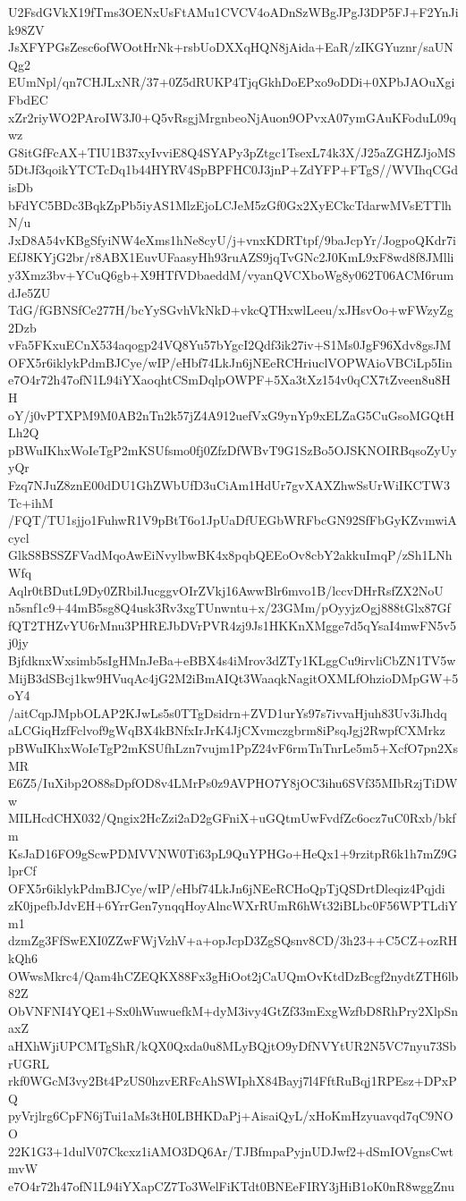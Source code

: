 U2FsdGVkX19fTms3OENxUsFtAMu1CVCV4oADnSzWBgJPgJ3DP5FJ+F2YnJik98ZV
JsXFYPGsZesc6ofWOotHrNk+rsbUoDXXqHQN8jAida+EaR/zIKGYuznr/saUNQg2
EUmNpl/qn7CHJLxNR/37+0Z5dRUKP4TjqGkhDoEPxo9oDDi+0XPbJAOuXgiFbdEC
xZr2riyWO2PAroIW3J0+Q5vRsgjMrgnbeoNjAuon9OPvxA07ymGAuKFoduL09qwz
G8itGfFcAX+TIU1B37xyIvviE8Q4SYAPy3pZtgc1TsexL74k3X/J25aZGHZJjoMS
5DtJf3qoikYTCTcDq1b44HYRV4SpBPFHC0J3jnP+ZdYFP+FTgS//WVIhqCGdisDb
bFdYC5BDc3BqkZpPb5iyAS1MlzEjoLCJeM5zGf0Gx2XyECkcTdarwMVsETTlhN/u
JxD8A54vKBgSfyiNW4eXms1hNe8cyU/j+vnxKDRTtpf/9baJcpYr/JogpoQKdr7i
EfJ8KYjG2br/r8ABX1EuvUFaasyHh93ruAZS9jqTvGNc2J0KmL9xF8wd8f8JMlli
y3Xmz3bv+YCuQ6gb+X9HTfVDbaeddM/vyanQVCXboWg8y062T06ACM6rumdJe5ZU
TdG/fGBNSfCe277H/bcYySGvhVkNkD+vkcQTHxwlLeeu/xJHsvOo+wFWzyZg2Dzb
vFa5FKxuECnX534aqogp24VQ8Yu57bYgcI2Qdf3ik27iv+S1Ms0JgF96Xdv8gsJM
OFX5r6iklykPdmBJCye/wIP/eHbf74LkJn6jNEeRCHriuclVOPWAioVBCiLp5Iin
e7O4r72h47ofN1L94iYXaoqhtCSmDqlpOWPF+5Xa3tXz154v0qCX7tZveen8u8HH
oY/j0vPTXPM9M0AB2nTn2k57jZ4A912uefVxG9ynYp9xELZaG5CuGsoMGQtHLh2Q
pBWuIKhxWoIeTgP2mKSUfsmo0fj0ZfzDfWBvT9G1SzBo5OJSKNOIRBqsoZyUyyQr
Fzq7NJuZ8znE00dDU1GhZWbUfD3uCiAm1HdUr7gvXAXZhwSsUrWiIKCTW3Tc+ihM
/FQT/TU1sjjo1FuhwR1V9pBtT6o1JpUaDfUEGbWRFbcGN92SfFbGyKZvmwiAcycl
GlkS8BSSZFVadMqoAwEiNvylbwBK4x8pqbQEEoOv8cbY2akkuImqP/zSh1LNhWfq
Aqlr0tBDutL9Dy0ZRbilJucggvOIrZVkj16AwwBlr6mvo1B/lccvDHrRsfZX2NoU
n5snf1c9+44mB5sg8Q4usk3Rv3xgTUnwntu+x/23GMm/pOyyjzOgj888tGlx87Gf
fQT2THZvYU6rMnu3PHREJbDVrPVR4zj9Js1HKKnXMgge7d5qYsaI4mwFN5v5j0jy
BjfdknxWxsimb5sIgHMnJeBa+eBBX4s4iMrov3dZTy1KLggCu9irvliCbZN1TV5w
MijB3dSBcj1kw9HVuqAc4jG2M2iBmAIQt3WaaqkNagitOXMLfOhzioDMpGW+5oY4
/aitCqpJMpbOLAP2KJwLs5s0TTgDsidrn+ZVD1urYs97s7ivvaHjuh83Uv3iJhdq
aLCGiqHzfFclvof9gWqBX4kBNfxIrJrK4JjCXvmczgbrm8iPsqJgj2RwpfCXMrkz
pBWuIKhxWoIeTgP2mKSUfhLzn7vujm1PpZ24vF6rmTnTnrLe5m5+XcfO7pn2XsMR
E6Z5/IuXibp2O88sDpfOD8v4LMrPs0z9AVPHO7Y8jOC3ihu6SVf35MIbRzjTiDWw
MILHcdCHX032/Qngix2HcZzi2aD2gGFniX+uGQtmUwFvdfZc6ocz7uC0Rxb/bkfm
KsJaD16FO9gScwPDMVVNW0Ti63pL9QuYPHGo+HeQx1+9rzitpR6k1h7mZ9GlprCf
OFX5r6iklykPdmBJCye/wIP/eHbf74LkJn6jNEeRCHoQpTjQSDrtDleqiz4Pqjdi
zK0jpefbJdvEH+6YrrGen7ynqqHoyAlncWXrRUmR6hWt32iBLbc0F56WPTLdiYm1
dzmZg3FfSwEXI0ZZwFWjVzhV+a+opJcpD3ZgSQsnv8CD/3h23++C5CZ+ozRHkQh6
OWwsMkrc4/Qam4hCZEQKX88Fx3gHiOot2jCaUQmOvKtdDzBcgf2nydtZTH6lb82Z
ObVNFNI4YQE1+Sx0hWuwuefkM+dyM3ivy4GtZf33mExgWzfbD8RhPry2XlpSnaxZ
aHXhWjiUPCMTgShR/kQX0Qxda0u8MLyBQjtO9yDfNVYtUR2N5VC7nyu73SbrUGRL
rkf0WGcM3vy2Bt4PzUS0hzvERFcAhSWIphX84Bayj7l4FftRuBqj1RPEsz+DPxPQ
pyVrjlrg6CpFN6jTui1aMs3tH0LBHKDaPj+AisaiQyL/xHoKmHzyuavqd7qC9NOO
22K1G3+1dulV07Ckcxz1iAMO3DQ6Ar/TJBfmpaPyjnUDJwf2+dSmIOVgnsCwtmvW
e7O4r72h47ofN1L94iYXapCZ7To3WelFiKTdt0BNEeFIRY3jHiB1oK0nR8wggZnu
